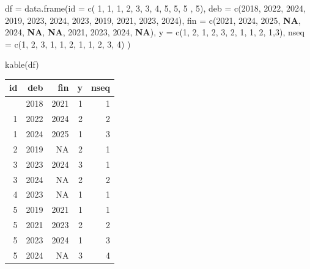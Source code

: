 \documentclass[
  12pt,
  letterpaper,
  DIV=11,
  numbers=noendperiod,
  onepage,
  openany]{scrreprt}
\newenvironment{Shaded}{\begin{snugshade}}{\end{snugshade}}
\newcommand{\AttributeTok}[1]{\textcolor[rgb]{0.80,0.80,0.80}{#1}}
\newcommand{\ConstantTok}[1]{\textcolor[rgb]{0.86,0.64,0.64}{\textbf{#1}}}
\newcommand{\DecValTok}[1]{\textcolor[rgb]{0.86,0.86,0.80}{#1}}
\newcommand{\FunctionTok}[1]{\textcolor[rgb]{0.94,0.94,0.56}{#1}}
\newcommand{\NormalTok}[1]{\textcolor[rgb]{0.80,0.80,0.80}{#1}}
\newcommand{\OtherTok}[1]{\textcolor[rgb]{0.94,0.94,0.56}{#1}}
\begin{document}
\begin{Shaded}
\begin{Highlighting}[]
\NormalTok{df }\OtherTok{=}  \FunctionTok{data.frame}\NormalTok{(}\AttributeTok{id  =}  \FunctionTok{c}\NormalTok{( }\DecValTok{1}\NormalTok{, }\DecValTok{1}\NormalTok{, }\DecValTok{1}\NormalTok{, }\DecValTok{2}\NormalTok{, }\DecValTok{3}\NormalTok{, }\DecValTok{3}\NormalTok{, }\DecValTok{4}\NormalTok{, }\DecValTok{5}\NormalTok{, }\DecValTok{5}\NormalTok{, }\DecValTok{5}\NormalTok{ , }\DecValTok{5}\NormalTok{),}
                 \AttributeTok{deb =}  \FunctionTok{c}\NormalTok{(}\DecValTok{2018}\NormalTok{, }\DecValTok{2022}\NormalTok{, }\DecValTok{2024}\NormalTok{, }\DecValTok{2019}\NormalTok{, }\DecValTok{2023}\NormalTok{, }\DecValTok{2024}\NormalTok{, }\DecValTok{2023}\NormalTok{, }\DecValTok{2019}\NormalTok{, }\DecValTok{2021}\NormalTok{, }\DecValTok{2023}\NormalTok{, }\DecValTok{2024}\NormalTok{),}
                 \AttributeTok{fin =}  \FunctionTok{c}\NormalTok{(}\DecValTok{2021}\NormalTok{, }\DecValTok{2024}\NormalTok{, }\DecValTok{2025}\NormalTok{, }\ConstantTok{NA}\NormalTok{, }\DecValTok{2024}\NormalTok{, }\ConstantTok{NA}\NormalTok{, }\ConstantTok{NA}\NormalTok{, }\DecValTok{2021}\NormalTok{, }\DecValTok{2023}\NormalTok{, }\DecValTok{2024}\NormalTok{, }\ConstantTok{NA}\NormalTok{), }
                 \AttributeTok{y  =}   \FunctionTok{c}\NormalTok{(}\DecValTok{1}\NormalTok{, }\DecValTok{2}\NormalTok{, }\DecValTok{1}\NormalTok{, }\DecValTok{2}\NormalTok{, }\DecValTok{3}\NormalTok{, }\DecValTok{2}\NormalTok{, }\DecValTok{1}\NormalTok{, }\DecValTok{1}\NormalTok{, }\DecValTok{2}\NormalTok{, }\DecValTok{1}\NormalTok{,}\DecValTok{3}\NormalTok{),}
                 \AttributeTok{nseq =} \FunctionTok{c}\NormalTok{(}\DecValTok{1}\NormalTok{, }\DecValTok{2}\NormalTok{, }\DecValTok{3}\NormalTok{, }\DecValTok{1}\NormalTok{, }\DecValTok{1}\NormalTok{, }\DecValTok{2}\NormalTok{, }\DecValTok{1}\NormalTok{, }\DecValTok{1}\NormalTok{, }\DecValTok{2}\NormalTok{, }\DecValTok{3}\NormalTok{, }\DecValTok{4}\NormalTok{)}
\NormalTok{)}

\FunctionTok{kable}\NormalTok{(df)}
\end{Highlighting}
\end{Shaded}

\begin{longtable}[]{@{}rrrrr@{}}
\toprule\noalign{}
id & deb & fin & y & nseq \\
\midrule\noalign{}
\endhead
\bottomrule\noalign{}
\endlastfoot
1 & 2018 & 2021 & 1 & 1 \\
1 & 2022 & 2024 & 2 & 2 \\
1 & 2024 & 2025 & 1 & 3 \\
2 & 2019 & NA & 2 & 1 \\
3 & 2023 & 2024 & 3 & 1 \\
3 & 2024 & NA & 2 & 2 \\
4 & 2023 & NA & 1 & 1 \\
5 & 2019 & 2021 & 1 & 1 \\
5 & 2021 & 2023 & 2 & 2 \\
5 & 2023 & 2024 & 1 & 3 \\
5 & 2024 & NA & 3 & 4 \\
\end{longtable}
\end{document}
